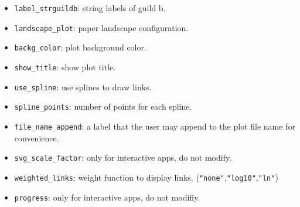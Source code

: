 \documentclass[12pt]{article}
\begin{document}
\begin{itemize}
\item \texttt{label\_strguildb}: string labels of guild b.

\item \texttt{landscape\_plot}: paper landscape configuration.

\item \texttt{backg\_color}: plot background color.

\item \texttt{show\_title}: show plot title.

\item \texttt{use\_spline}: use splines to draw links.

\item \texttt{spline\_points}: number of points for each spline.

\item \texttt{file\_name\_append}: a label that the user may append to the plot file name for convenience.

\item \texttt{svg\_scale\_factor}: only for interactive apps, do not modify.

\item \texttt{weighted\_links}: weight function to display links, (\texttt{"none"},\texttt{"log10"},\texttt{"ln"})

\item \texttt{progress}: only for interactive apps, do not modifiy.
\end{itemize}


\normalsize

\clearpage
\printbibliography[heading=bibintoc]
\end{document}
